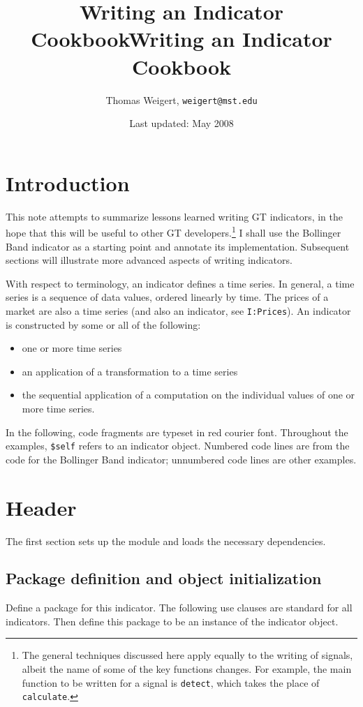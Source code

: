 \documentclass[11pt,twoside]{article}
\author{Thomas Weigert, {\tt weigert@mst.edu}}
\title{Writing an Indicator Cookbook}
\date{Last updated: May 2008}
\title{Writing an Indicator Cookbook}
\begin{document}
\maketitle

\section{Introduction}
This note attempts to summarize lessons learned writing GT indicators,
in the hope that this will be useful to other GT developers.\footnote{The
general techniques discussed here apply equally to the writing of signals,
albeit the name of some of the key functions changes. For example, the main
function to be written for a signal is \lstinline!detect!, which takes the
place of \lstinline!calculate!.}
I shall use the Bollinger Band indicator as a starting point and
annotate its implementation. Subsequent sections will illustrate more
advanced aspects of writing indicators.

With respect to terminology, an indicator defines a time series. In general,
a time series is a sequence of data values, ordered linearly by time. The
prices of a market are also a time series (and also an indicator, see \lstinline!I:Prices!). An indicator is constructed by some or all of the following:
\begin{itemize}
\item one or more time series
\item an application of a transformation to a time series
\item the sequential application of a computation on the individual
values of one or more time series.
\end{itemize}


In the following, code fragments are typeset in red courier font.
Throughout the examples, \lstinline!$self! refers to an
indicator object. Numbered code lines are from the code for the
Bollinger Band indicator; unnumbered code lines are other examples.

\section{Header}
The first section sets up the module and loads the necessary
dependencies.

\subsection{Package definition and object initialization}
Define a package for this indicator. The following use clauses are
standard for all indicators. Then define this package to be an instance
of the indicator object.
\end{document}
